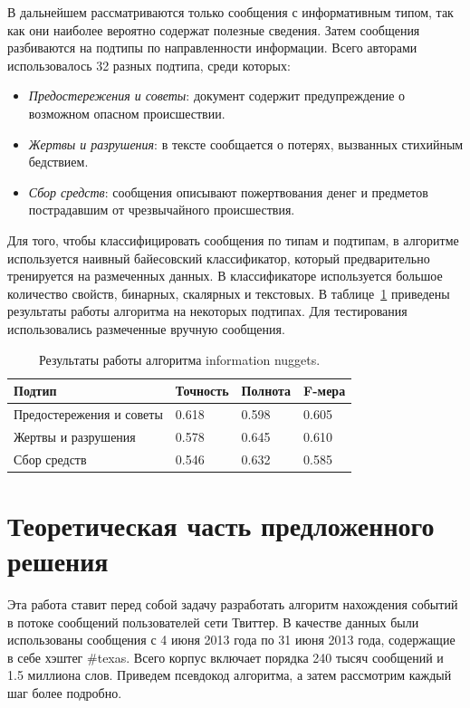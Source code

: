 \documentclass[12pt, a4paper]{article}
\begin{document}
	В дальнейшем рассматриваются только сообщения с информативным типом, так как они наиболее вероятно содержат полезные сведения. Затем сообщения разбиваются на подтипы по направленности информации. Всего авторами использовалось 32 разных подтипа, среди которых:
	\begin{itemize}
	\item\emph{Предостережения и советы}: документ содержит предупреждение о возможном опасном происшествии.
	\item\emph{Жертвы и разрушения}: в тексте сообщается о потерях, вызванных стихийным бедствием.
	\item\emph{Сбор средств}: сообщения описывают пожертвования денег и предметов пострадавшим от чрезвычайного происшествия.
	\end{itemize}
	
	Для того, чтобы классифицировать сообщения по типам и подтипам, в алгоритме используется наивный байесовский классификатор, который предварительно тренируется на размеченных данных. В классификаторе используется большое количество свойств, бинарных, скалярных и текстовых. В таблице~\ref{nuggets-table} приведены результаты работы алгоритма на некоторых подтипах. Для тестирования использовались размеченные вручную сообщения.
	\begin{table}[h]
	\centering
	\begin{tabular}{ | l | l | l | l | }
	\hline
	Подтип & Точность & Полнота & F-мера \\ \hline
	Предостережения и советы & 0.618 & 0.598 & 0.605 \\ \hline
	Жертвы и разрушения & 0.578 & 0.645 & 0.610 \\ \hline
	Сбор средств & 0.546 & 0.632 & 0.585 \\ \hline
	\end{tabular}
	\caption{Результаты работы алгоритма information nuggets.}
	\label{nuggets-table}
	\end{table}
  
  \section{Теоретическая часть предложенного решения}
  Эта работа ставит перед собой задачу разработать алгоритм нахождения событий в потоке сообщений пользователей сети Твиттер. В качестве данных были использованы сообщения с 4 июня 2013 года по 31 июня 2013 года, содержащие в себе хэштег \#texas. Всего корпус включает порядка 240 тысяч сообщений и 1.5 миллиона слов. Приведем псевдокод алгоритма, а затем рассмотрим каждый шаг более подробно. 
  
\end{document}
